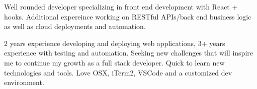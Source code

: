 

\begin{cvparagraph}

Well rounded developer specializing in front end development with React + hooks. Additional expereince working on RESTful APIs/back end business logic as well as cloud deployments and automation.
\end{cvparagraph}
\begin{cvparagraph}
2 years experience developing and deploying web applications, 3+ years experience with testing and automation. Seeking new challenges that will inspire me to continue my growth as a full stack developer. Quick to learn new technologies and tools. Love OSX, iTerm2, VSCode and a customized dev environment.
\end{cvparagraph}

